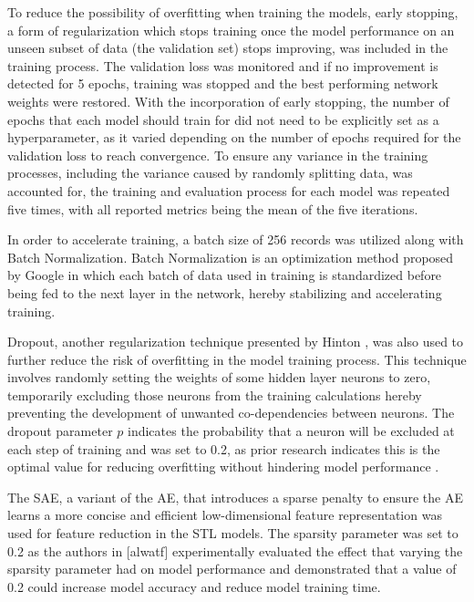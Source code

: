\documentclass[conference]{IEEEtran}
\begin{document}
To reduce the possibility of overfitting when training the models, early stopping, a form of regularization which stops training once the model performance on an unseen subset of data (the validation set) stops improving, was included in the training process.  The validation loss was monitored and if no improvement is detected for 5 epochs, training was stopped and the best performing network weights were restored. With the incorporation of early stopping, the number of epochs that each model should train for did not need to be explicitly set as a hyperparameter, as it varied depending on the number of epochs required for the validation loss to reach convergence. To ensure any variance in the training processes, including the variance caused by randomly splitting data, was accounted for, the training and evaluation process for each model was repeated five times, with all reported metrics being the mean of the five iterations. 

In order to accelerate training, a batch size of 256 records was utilized along with Batch Normalization. Batch Normalization is an optimization method proposed by Google in which each batch of data used in training is standardized before being fed to the next layer in the network, hereby stabilizing and accelerating training. 

Dropout, another regularization technique presented by Hinton \cite{b23}, was also used to further reduce the risk of overfitting in the model training process. This technique involves randomly setting the weights of some hidden layer neurons to zero, temporarily excluding those neurons from the training calculations hereby preventing the development of unwanted co-dependencies between neurons. The dropout parameter $p$ indicates the probability that a neuron will be excluded at each step of training and was set to 0.2, as prior research indicates this is the optimal value for reducing overfitting without hindering model performance \cite{b14}.

The SAE, a variant of the AE, that introduces a sparse penalty to ensure the AE learns a more concise and efficient low-dimensional feature representation was used for feature reduction in the STL models. The sparsity parameter was set to 0.2 as the authors in [alwatf] experimentally evaluated the effect that varying the sparsity parameter had on model performance and demonstrated that a value of 0.2 could increase model accuracy and reduce model training time.  

\end{document}
